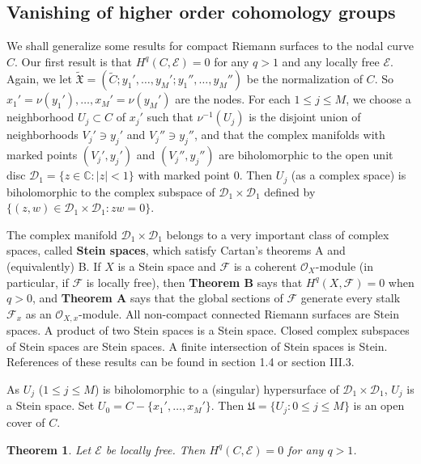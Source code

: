 \documentclass[12pt,a4paper,notitlepage]{report}
\theoremstyle{definition}
\theoremstyle{plain}
\newtheorem{thm}[df]{Theorem}
\newcommand{\fk}{\mathfrak}
\newcommand{\mc}{\mathcal}
\newcommand{\wtd}{\widetilde}
\newcommand{\scr}{\mathscr}
\numberwithin{equation}{section}
\begin{document}
\subsection*{Vanishing of higher order cohomology groups}

We shall generalize some results for compact Riemann surfaces to the nodal curve $C$. Our first result is that $H^q(C,\scr E)=0$ for any $q>1$ and any locally free $\scr E$. Again, we let $\wtd{\fk X}=(\wtd C;y_1',\dots,y_M';y_1'',\dots,y_M'')$ be the normalization of $C$. So $x_1'=\nu(y_1'),\dots,x_M'=\nu(y_M')$ are the nodes. For each $1\leq j\leq M$, we choose a neighborhood $U_j\subset C$ of $x_j'$ such that $\nu^{-1}(U_j)$ is the disjoint union of neighborhoods $V_j'\ni y_j'$ and $V_j''\ni y_j''$, and that the complex manifolds with marked points $(V_j',y_j')$ and $(V_j'',y_j'')$ are biholomorphic to the open unit disc $\mc D_1=\{z\in\mathbb C:|z|<1 \}$ with marked point $0$. Then $U_j$ (as a complex space) is biholomorphic to the complex subspace of $\mc D_1\times \mc D_1$ defined by $\{(z,w)\in \mc D_1\times \mc D_1:zw=0\}$. 

The complex manifold $\mc D_1\times \mc D_1$ belongs to a very important class of complex spaces, called \textbf{Stein spaces}, which satisfy Cartan's theorems A and (equivalently) B. If $X$ is a Stein space and $\scr F$ is a coherent $\scr O_X$-module (in particular, if $\scr F$ is  locally free), then \textbf{Theorem B} says that $H^q(X,\scr F)=0$ when $q>0$, and \textbf{Theorem A} says that the global sections of $\scr F$ generate every stalk $\scr F_x$ as an $\scr O_{X,x}$-module.  All non-compact connected Riemann surfaces are Stein spaces. A  product  of two Stein spaces is a Stein space. Closed complex subspaces of Stein spaces are Stein spaces. A finite intersection of Stein spaces is Stein. References of these results can be found in \cite{GR84} section 1.4 or \cite{GPR94} section III.3. 

As $U_j$ ($1\leq j\leq M$) is biholomorphic to a (singular) hypersurface of $\mc D_1\times \mc D_1$, $U_j$ is a Stein space. Set $U_0=C-\{x_1',\dots,x_M'\}$. Then $\fk U=\{U_j:0\leq j\leq M \}$ is an open cover of $C$.

\begin{thm}\label{lb7}
Let $\scr E$ be locally free. Then $H^q(C,\scr E)=0$ for any $q>1$.
\end{thm}
\end{document}
